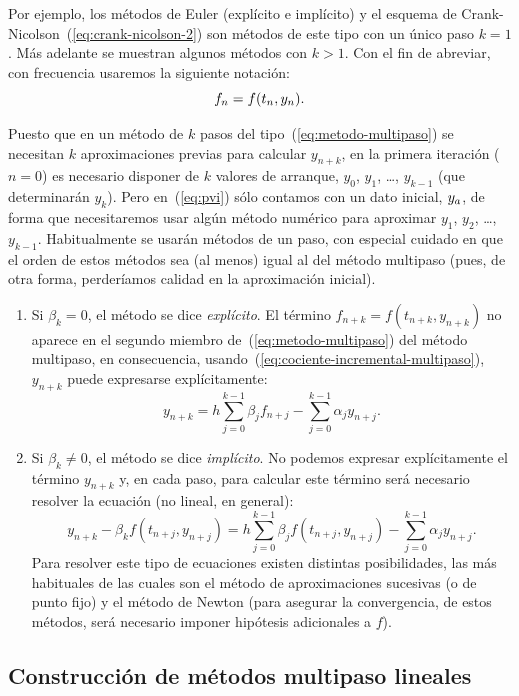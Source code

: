 Por ejemplo, los métodos de Euler (explícito e implícito) y el esquema
de Crank-Nicolson~(\ref{eq:crank-nicolson-2}) son métodos de este tipo
con un único paso $k=1$. Más adelante se muestran algunos métodos con
$k>1$.
Con el fin de abreviar, con frecuencia usaremos la siguiente notación:
$$f_n=f({t_n},{y_n}).$$

Puesto que en un método de $k$ pasos del
tipo~(\ref{eq:metodo-multipaso}) se necesitan $k$ aproximaciones
previas para calcular $y_{n+k}$, en la primera iteración ($n=0$) es
necesario disponer de $k$ valores de arranque, $y_0$, $y_1$, \dots,
$y_{k-1}$ (que determinarán $y_k$). Pero en~(\ref{eq:pvi}) sólo
contamos con un dato inicial, ${y_a}$, de forma que necesitaremos
usar algún método numérico para aproximar $y_1$, $y_2$, \dots,
$y_{k-1}$. Habitualmente se usarán métodos de un paso, con especial
cuidado en que el orden de estos métodos sea (al menos) igual al
del método multipaso (pues, de otra forma, perderíamos calidad en la
aproximación inicial).

\begin{enumerate}
\item Si $\beta_k=0$, el método se dice \emph{explícito}. El término
  $f_{n+k}=f(t_{n+k},y_{n+k})$ no aparece en el segundo miembro
  de~(\ref{eq:metodo-multipaso}) del método multipaso, en
  consecuencia, usando~(\ref{eq:cociente-incremental-multipaso}),
  $y_{n+k}$ puede expresarse explícitamente:
  \begin{equation*}
    y_{n+k}=
    h\sum_{j=0}^{k-1} \beta_j f_{n+j}-\sum_{j=0}^{k-1}\alpha_j y_{n+j}.
  \end{equation*}
\item Si $\beta_k\neq 0$, el método se dice \emph{implícito}. No podemos
  expresar explícitamente el término $y_{n+k}$ y, en cada paso,
  para calcular este término será necesario resolver la ecuación (no
  lineal, en general):
  \begin{equation*}
    y_{n+k} - \beta_k f(t_{n+j},y_{n+j})=
     h\sum_{j=0}^{k-1} \beta_j f(t_{n+j},y_{n+j})- \sum_{j=0}^{k-1}\alpha_j y_{n+j} .
  \end{equation*}
  Para resolver este tipo de ecuaciones existen distintas
  posibilidades, las más habituales de las cuales son el método de
  aproximaciones sucesivas (o de punto fijo) y el método de Newton
  (para asegurar la convergencia, de estos métodos, será necesario
  imponer hipótesis adicionales a $f$).
\end{enumerate}

\subsection*{Construcción de métodos multipaso lineales}

